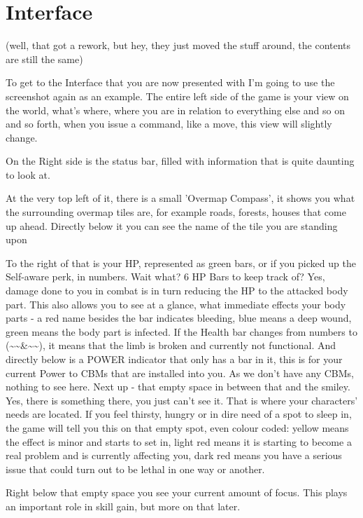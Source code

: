 \documentclass[11pt]{report}
\begin{document}
\section{Interface}

(well, that got a rework, but hey, they just moved the stuff around, the contents are still the same)

To get to the Interface that you are now presented with I'm going to use the screenshot again as an example.
The entire left side of the game is your view on the world, what's where, where you are in relation to everything else and so on and so forth, when you issue a command, like a move, this view will slightly change.

On the Right side is the status bar, filled with information that is quite daunting to look at.

At the very top left of it, there is a small 'Overmap Compass', it shows you what the surrounding overmap tiles are, for example roads, forests, houses that come up ahead. Directly below it you can see the name of the tile you are standing upon

To the right of that is your HP, represented as green bars, or if you picked up the Self-aware perk, in numbers.
Wait what? 6 HP Bars to keep track of? Yes, damage done to you in combat is in turn reducing the HP to the attacked body part. This also allows you to see at a glance, what immediate effects your body parts - a red name besides the bar indicates bleeding, blue means a deep wound, green means the body part is infected. If the Health bar changes from numbers to (\~{}\~{}\&\~{}\~{}), it means that the limb is broken and currently not functional.
And directly below is a POWER indicator that only has a bar in it, this is for your current Power to CBMs that are installed into you. As we don't have any CBMs, nothing to see here.
Next up - that empty space in between that and the smiley. Yes, there is something there, you just can't see it. That is where your characters' needs are located. If you feel thirsty, hungry or in dire need of a spot to sleep in, the game will tell you this on that empty spot, even colour coded: yellow means the effect is minor and starts to set in, light red means it is starting to become a real problem and is currently affecting you, dark red means you have a serious issue that could turn out to be lethal in one way or another.

Right below that empty space you see your current amount of focus. This plays an important role in skill gain, but more on that later.
\end{document}
